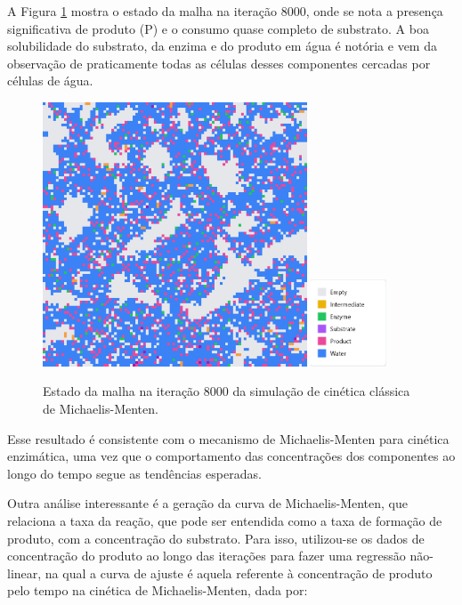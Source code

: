 \documentclass[12pt,oneside]{report}
\begin{document}
A Figura \ref{fig:MM_8000it} mostra o estado da malha na iteração 8000, onde se nota a presença significativa de produto (P) e o consumo quase completo de substrato. A boa solubilidade do substrato, da enzima e do produto em água é notória e vem da observação de praticamente todas as células desses componentes cercadas por células de água.

\begin{figure}[H]
    \centering
    \includegraphics[width=0.7\textwidth]{img/MM_8000it_S0.png}
    \hspace{0.05\textwidth}
    \includegraphics[width=0.2\textwidth]{img/legend.png}
    \caption{\small Estado da malha na iteração 8000 da simulação de cinética clássica de Michaelis-Menten.}
    \label{fig:MM_8000it}
\end{figure}

Esse resultado é consistente com o mecanismo de Michaelis-Menten para cinética enzimática, uma vez que o comportamento das concentrações dos componentes ao longo do tempo segue as tendências esperadas.

Outra análise interessante é a geração da curva de Michaelis-Menten, que relaciona a taxa da reação, que pode ser entendida como a taxa de formação de produto, com a concentração do substrato. Para isso, utilizou-se os dados de concentração do produto ao longo das iterações para fazer uma regressão não-linear, na qual a curva de ajuste é aquela referente à concentração de produto pelo tempo na cinética de Michaelis-Menten, dada por:
\end{document}
